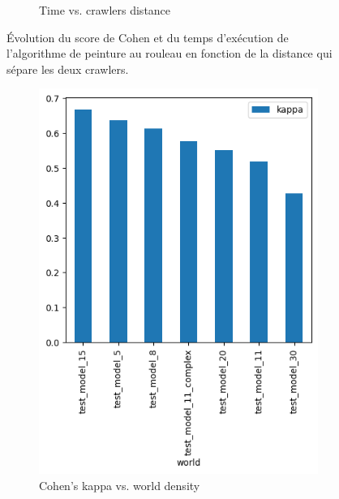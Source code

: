 \documentclass[francais,RandD]{rapportPFE}
\begin{document}
\begin{figure}[h!]
\begin{subfigure}[t]{0.49\linewidth}
					\caption{Time vs. crawlers distance}
					\label{fig:peinture_au_rouleau-time_vs_distance}
			\end{subfigure}
			\caption{Évolution du score de Cohen et du temps d'exécution de l'algorithme de peinture au rouleau en fonction de la distance qui sépare les deux crawlers.}
			\label{fig:peinture_au_rouleau-distance}
		\end{figure}

		\begin{figure}[h!]
			\begin{subfigure}[t]{0.49\linewidth}
				\includegraphics[width=\linewidth]{graphics/ski_nordique-kappa_vs_world.png}
				\caption{Cohen's kappa vs. world density}
				\label{fig:ski_nordique-kappa_vs_world}
			\end{subfigure}
			\hfill
			\begin{subfigure}[t]{0.49\linewidth}

\end{subfigure}
\end{figure}
\end{document}

